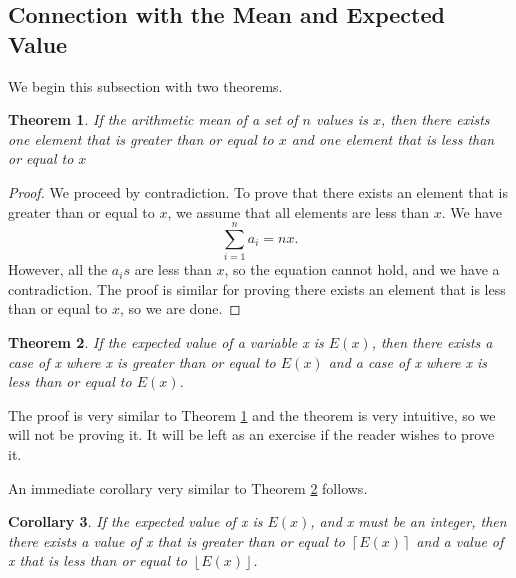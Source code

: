 \documentclass[l1pt]{article}
\theoremstyle{plain}
\newtheorem{thm}{Theorem}[section]
\newtheorem{corollary}[thm]{Corollary}
\theoremstyle{definition}
\theoremstyle{remark}
\begin{document}
\subsection{Connection with the Mean and Expected Value}
We begin this subsection with two theorems.

\begin{mdframed}
    \begin{thm}
    \label{thm:arithmetic mean}
    If the arithmetic mean of a set of $n$ values is $x$, then there exists one element that is greater than or equal to $x$ and one element that is less than or equal to $x$
    \end{thm}
\end{mdframed}

\begin{proof}
We proceed by contradiction. To prove that there exists an element that is greater than or equal to $x$, we assume that all elements are less than $x$. We have \[\sum_{i=1}^n a_i=nx .\] However, all the $a_is$ are less than $x$, so the equation cannot hold, and we have a contradiction. The proof is similar for proving there exists an element that is less than or equal to $x$, so we are done.
\end{proof}

\begin{mdframed}
    \begin{thm}
    \label{thm:expected value}
    If the expected value of a variable x is $E(x)$, then there exists a case of x where x is greater than or equal to $E(x)$ and a case of x where x is less than or equal to $E(x)$.
    \end{thm}
\end{mdframed}

The proof is very similar to Theorem \ref{thm:arithmetic mean} and the theorem is very intuitive, so we will not be proving it. It will be left as an exercise if the reader wishes to prove it. 

An immediate corollary very similar to Theorem \ref{thm:expected value} follows.

\begin{mdframed}
    \begin{corollary}
    If the expected value of x is $E(x)$, and x must be an integer, then there exists a value of x that is greater than or equal to $\left \lceil{E(x)}\right \rceil$ and a value of x that is less than or equal to $\left \lfloor{E(x)}\right \rfloor $.
    \end{corollary}
\end{mdframed}
\end{document}
